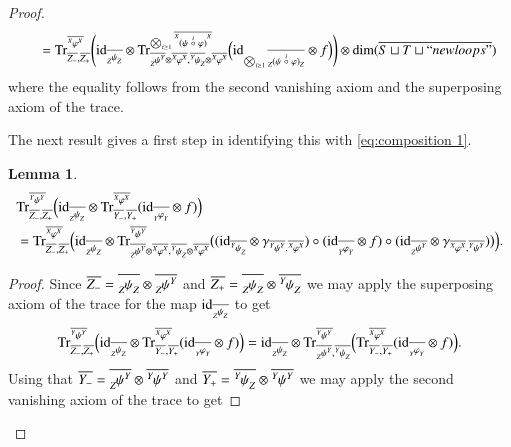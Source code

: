 \documentclass{amsart}
\def\tn{\textnormal}
\def\dim{\tn{dim}}
\def\Trace{\tn{Tr}}
\def\hsp{\hspace{.3in}}
\def\ol{\overline}
\def\id{\tn{id}}
\newcommand{\inp}[1]{{#1_-}}
\newcommand{\outp}[1]{{#1_+}}
\newcommand{\feeddd}[3]{{\tensor*[^{#2}_{\color{white}{!}}]{{#1}}{^{#3}}}}%
\newcommand{\feeddc}[3]{{\tensor*[^{#2}]{{#1}}{_{#3}}}}
\newcommand{\feedcd}[3]{{\tensor*[_{#2}]{{#1}}{^{#3}}}}
\newcommand{\feedcc}[3]{{\tensor*[^{\color{white}{!}}_{#2}]{{#1}}{_{#3}}}}
\newtheorem{lemma}[subsubsection]{Lemma}
\theoremstyle{remark}
\theoremstyle{definition}
\begin{document}
\begin{proof}
\begin{align*}
 &\hsp=\Trace^{\ol{\feeddd{\varphi}{X}{X}}}_{\ol{Z_-},\ol{Z_+}}\Bigg(
 \id_{\ol{\feedcc{\psi}{Z}{Z}}}\otimes\Trace^{\bigotimes_{i\ge1}\ol{\feeddd{(\psi\;\accentset{i}{\circ}\;\varphi)}{X}{X}}}_{\ol{\feedcd{\psi}{Z}{Y}}\otimes\ol{\feeddd{\varphi}{X}{X}},\ol{\feeddc{\psi}{Y}{Z}}\otimes\ol{\feeddd{\varphi}{X}{X}}}\Big(\id_{\bigotimes_{i\ge1}\ol{\feedcc{(\psi\;\accentset{i}{\circ}\;\varphi)}{Z}{Z}}}\otimes f\Big)
 \Bigg)\otimes\dim(\ol{S\sqcup T\sqcup ``newloops"})
\end{align*}
where the equality follows from the second vanishing axiom and the superposing axiom of the trace. 

The next result gives a first step in identifying this with \eqref{eq:composition 1}.
\begin{lemma}\label{le:combining traces}
 \begin{align*}
&\Trace^{\ol{\feeddd{\psi}{Y}{Y}}}_{\ol{Z_-},\ol{Z_+}}
\Big(
\id_{\ol{\feedcc{\psi}{Z}{Z}}}\otimes
\Trace^{\ol{\feeddd{\varphi}{X}{X}}}_{\ol{Y_-},\ol{Y_+}}(\id_{\ol{\feedcc{\varphi}{Y}{Y}}}\otimes f)
\Big)\\
&=\Trace^{\ol{\feeddd{\varphi}{X}{X}}}_{\ol{\inp{Z}},\ol{\outp{Z}}}
\Big(
\id_{\ol{\feedcc{\psi}{Z}{Z}}}\otimes\Trace^{\ol{\feeddd{\psi}{Y}{Y}}}_{\ol{\feedcd{\psi}{Z}{Y}}\otimes\ol{\feeddd{\varphi}{X}{X}},\ol{\feeddc{\psi}{Y}{Z}}\otimes\ol{\feeddd{\varphi}{X}{X}}}
\big(
(\id_{\ol{\feeddc{\psi}{Y}{Z}}}\otimes\gamma_{\ol{\feeddd{\psi}{Y}{Y}},\ol{\feeddd{\varphi}{X}{X}}})\circ(\id_{\ol{\feedcc{\varphi}{Y}{Y}}}\otimes f)\circ(\id_{\ol{\feedcd{\psi}{Z}{Y}}}\otimes\gamma_{\ol{\feeddd{\varphi}{X}{X}},\ol{\feeddd{\psi}{Y}{Y}}})
\big)
\Big).
\end{align*}
\end{lemma}
\begin{proof}
Since $\ol{Z_-}=\ol{\feedcc{\psi}{Z}{Z}}\otimes\ol{\feedcd{\psi}{Z}{Y}}$ and $\ol{Z_+}=\ol{\feedcc{\psi}{Z}{Z}}\otimes\ol{\feeddc{\psi}{Y}{Z}}$ we may apply the superposing axiom of the trace for the map $\id_{\ol{\feedcc{\psi}{Z}{Z}}}$ to get
\[\Trace^{\ol{\feeddd{\psi}{Y}{Y}}}_{\ol{Z_-},\ol{Z_+}}
\Big(
\id_{\ol{\feedcc{\psi}{Z}{Z}}}\otimes\Trace^{\ol{\feeddd{\varphi}{X}{X}}}_{\ol{Y_-},\ol{Y_+}}(\id_{\ol{\feedcc{\varphi}{Y}{Y}}}\otimes f)
\Big)=\id_{\ol{\feedcc{\psi}{Z}{Z}}}\otimes\Trace^{\ol{\feeddd{\psi}{Y}{Y}}}_{\ol{\feedcd{\psi}{Z}{Y}},\ol{\feeddc{\psi}{Y}{Z}}}
\Big(
\Trace^{\ol{\feeddd{\varphi}{X}{X}}}_{\ol{Y_-},\ol{Y_+}}(\id_{\ol{\feedcc{\varphi}{Y}{Y}}}\otimes f)
\Big).\]
Using that $\ol{Y_-}=\ol{\feedcd{\psi}{Z}{Y}}\otimes\ol{\feeddd{\psi}{Y}{Y}}$ and $\ol{Y_+}=\ol{\feeddc{\psi}{Y}{Z}}\otimes\ol{\feeddd{\psi}{Y}{Y}}$ we may apply the second vanishing axiom of the trace to get

\end{proof}
\end{proof}
\end{document}
